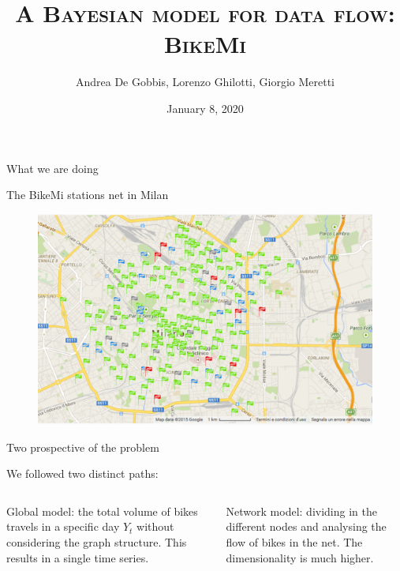 \documentclass{beamer}
\title{\textsc{A Bayesian model for data flow: BikeMi}}
\subtitle{}
\author{Andrea De Gobbis, Lorenzo Ghilotti, Giorgio Meretti}
\institute{Politecnico di Milano}
\date{January 8, 2020}
\begin{document}
\begin{frame}
	\maketitle	
\end{frame}

\begin{frame}{What we are doing}

The BikeMi stations net in Milan
\begin{figure}[H]
\centering
\includegraphics[width=1\linewidth]{pictures/mappa.png} 
\end{figure}

\end{frame}


\begin{frame}{Two prospective of the problem}

We followed two distinct paths:

\vspace{5mm}

\begin{columns}

\begin{column}{.5\textwidth}

	\alert{Global model:} the total volume of bikes travels in a specific day $Y_t$ without considering the graph structure. This results in a single time series.

\end{column}

\hspace{5pt}

\vrule{}

\hspace{8pt}

\begin{column}{.5\textwidth}
	{
	\alert{Network model:} dividing in the different nodes and analysing the flow of bikes in the net. The dimensionality is much higher.
	}

\end{column}

\end{columns}

\end{frame}
\end{document}
